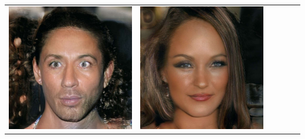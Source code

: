 \documentclass[a0,landscape]{a0poster}
\begin{document}
\begin{multicols}{3}
\begin{center}
\begin{tabular}{cc|cc|cc}
\includegraphics[width=\pganw]{../figures/pgan/60_base_iso_base.jpg} &
\includegraphics[width=\pganw]{../figures/pgan/61_base_iso_base.jpg} &

\end{tabular}
\end{center}
\end{multicols}
\end{document}
